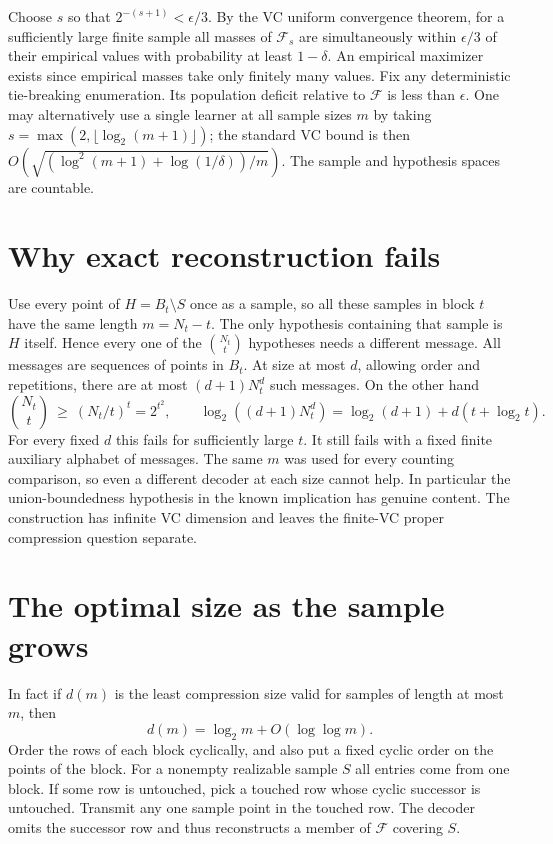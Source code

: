 \documentclass[11pt]{article}
\begin{document}
Choose $s$ so that $2^{-(s+1)}<\epsilon/3$. By the VC uniform convergence theorem, for a sufficiently large finite sample all masses of $\mathcal F_s$ are simultaneously within $\epsilon/3$ of their empirical values with probability at least $1-\delta$. An empirical maximizer exists since empirical masses take only finitely many values. Fix any deterministic tie-breaking enumeration. Its population deficit relative to $\mathcal F$ is less than $\epsilon$. One may alternatively use a single learner at all sample sizes $m$ by taking $s=\max(2,\lfloor\log_2(m+1)\rfloor)$; the standard VC bound is then $O(\sqrt{(\log^2(m+1)+\log(1/\delta))/m})$. The sample and hypothesis spaces are countable.

\section{Why exact reconstruction fails}
Use every point of $H=B_t\setminus S$ once as a sample, so all these samples in block $t$ have the same length $m=N_t-t$. The only hypothesis containing that sample is $H$ itself. Hence every one of the $\binom{N_t}{t}$ hypotheses needs a different message. All messages are sequences of points in $B_t$. At size at most $d$, allowing order and repetitions, there are at most $(d+1)N_t^d$ such messages. On the other hand
\[
 \binom{N_t}{t}\ \ge\ (N_t/t)^t=2^{t^2},\qquad
 \log_2((d+1)N_t^d)=\log_2(d+1)+d(t+\log_2 t).
\]
For every fixed $d$ this fails for sufficiently large $t$. It still fails with a fixed finite auxiliary alphabet of messages. The same $m$ was used for every counting comparison, so even a different decoder at each size cannot help. In particular the union-boundedness hypothesis in the known implication has genuine content. The construction has infinite VC dimension and leaves the finite-VC proper compression question separate.

\section{The optimal size as the sample grows}
In fact if $d(m)$ is the least compression size valid for samples of length at most $m$, then
\[
 d(m)=\log_2 m+O(\log\log m).
\]
Order the rows of each block cyclically, and also put a fixed cyclic order on the points of the block. For a nonempty realizable sample $S$ all entries come from one block. If some row is untouched, pick a touched row whose cyclic successor is untouched. Transmit any one sample point in the touched row. The decoder omits the successor row and thus reconstructs a member of $\mathcal F$ covering $S$.
\end{document}
